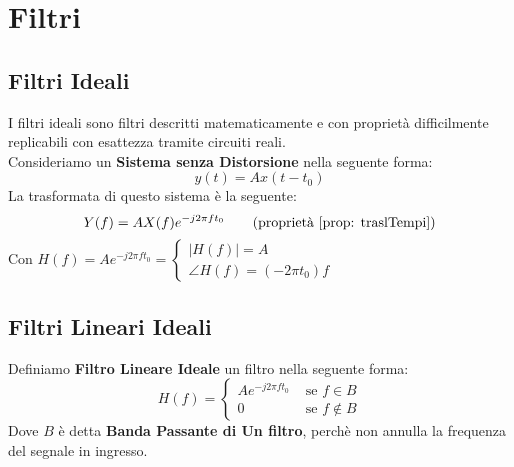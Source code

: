 \section{Filtri}
\subsection{Filtri Ideali}
I filtri ideali sono filtri descritti matematicamente e con proprietà difficilmente replicabili con esattezza
tramite circuiti reali.\\
Consideriamo un \textbf{Sistema senza Distorsione} nella seguente forma:
\begin{equation}
    y(t) = Ax(t - t_0)
\end{equation}
La trasformata di questo sistema è la seguente:
\begin{equation}
    Y(f) = AX(f)e^{-j2\pi ft_0} \tag{proprietà \eqref{prop: traslTempi}}
\end{equation}
Con $H(f) = Ae^{-j2\pi ft_0} = \begin{cases}
    |H(f)| = A\\
    \angle H(f) = (-2\pi t_0) f 
\end{cases}$
\subsection{Filtri Lineari Ideali}
Definiamo \textbf{Filtro Lineare Ideale} un filtro nella seguente forma:
\begin{equation}
    H(f) = \begin{cases}
        Ae^{-j2\pi ft_0} & \text{ se } f \in B\\
        0 & \text{ se } f \not\in B
    \end{cases}
\end{equation}
Dove $B$ è detta \textbf{Banda Passante di Un filtro}, perchè non annulla la frequenza del segnale in ingresso.

